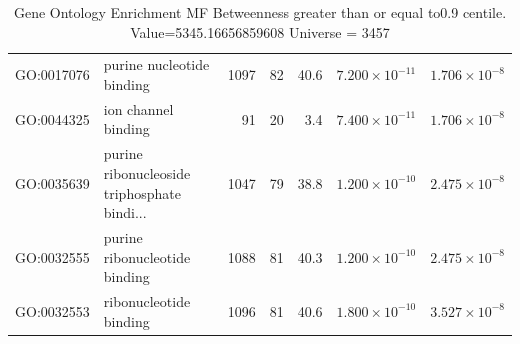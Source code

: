 \begin{table}[ht]
\begin{tabular}{llrrrrr}
  GO:0017076 & purine nucleotide binding & 1097 & 82 & 40.6 & $7.200 \times 10^{-11}$ & $1.706 \times 10^{-8}$ \\ 
  GO:0044325 & ion channel binding & 91 & 20 & 3.4 & $7.400 \times 10^{-11}$ & $1.706 \times 10^{-8}$ \\ 
  GO:0035639 & purine ribonucleoside triphosphate bindi... & 1047 & 79 & 38.8 & $1.200 \times 10^{-10}$ & $2.475 \times 10^{-8}$ \\ 
  GO:0032555 & purine ribonucleotide binding & 1088 & 81 & 40.3 & $1.200 \times 10^{-10}$ & $2.475 \times 10^{-8}$ \\ 
  GO:0032553 & ribonucleotide binding & 1096 & 81 & 40.6 & $1.800 \times 10^{-10}$ & $3.527 \times 10^{-8}$ \\ 
   \hline
\end{tabular}
\caption{Gene Ontology Enrichment MF Betweenness  greater than or equal to0.9 centile.   Value=5345.16656859608 Universe = 3457} 
\label{tab:Gene Ontology Enrichment MF Betweenness  greater than or equal to0.9 centile.   Value=5345.16656859608 Universe = 3457}
\end{table}

